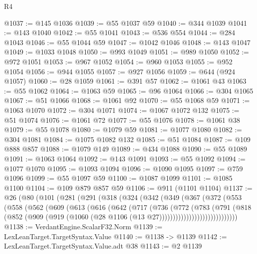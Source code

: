 \begin{lexlean}{R4}
\begin{coremodule}
@1037 := @145 @1036
@1039 := @55 @1037 @59
@1040 := @344 @1039
@1041 := @143 @1040
@1042 := @55 @1041
@1043 := @536 @554
@1044 := @284 @1043
@1046 := @55 @1044 @59
@1047 := @1042 @1046
@1048 := @143 @1047
@1049 := @1033 @1048
@1050 := @993 @1049
@1051 := @989 @1050
@1052 := @972 @1051
@1053 := @967 @1052
@1054 := @960 @1053
@1055 := @952 @1054
@1056 := @944 @1055
@1057 := @927 @1056
@1059 := @644 (@924 @1057)
@1060 := @28 @1059
@1061 := @391 @57
@1062 := @1061 @43
@1063 := @55 @1062
@1064 := @1063 @59
@1065 := @96 @1064
@1066 := @304 @1065
@1067 := @51 @1066
@1068 := @1061 @92
@1070 := @55 @1068 @59
@1071 := @1063 @1070
@1072 := @304 @1071
@1074 := @1067 @1072 @132
@1075 := @51 @1074
@1076 := @1061 @72
@1077 := @55 @1076
@1078 := @1061 @38
@1079 := @55 @1078
@1080 := @1079 @59
@1081 := @1077 @1080
@1082 := @304 @1081
@1084 := @1075 @1082 @132
@1085 := @51 @1084
@1087 := @109 @888 @857
@1088 := @1079 @149
@1089 := @434 @1088
@1090 := @55 @1089
@1091 := @1063 @1064
@1092 := @143 @1091
@1093 := @55 @1092
@1094 := @1077 @1070
@1095 := @1093 @1094
@1096 := @1090 @1095
@1097 := @759 @1096
@1099 := @55 @1097 @59
@1100 := @1087 @1099
@1101 := @1085 @1100
@1104 := @109 @879 @857 @59
@1106 := @911 (@1101 @1104)
@1137 := @26
    (@80
      (@101
        (@281
          (@291
            (@318
              (@324
                (@342
                  (@349
                    (@367
                      (@372
                        (@553
                          (@558
                            (@562
                              (@609
                                (@613
                                  (@616
                                    (@642
                                      (@717
                                        (@736
                                          (@772
                                            (@783
                                              (@791
                                                (@818
                                                  (@852
                                                    (@909
                                                      (@919
                                                        (@1060
                                                          (@28
                                                            @1106
                                                            (@13 @27)))))))))))))))))))))))))))))
@1138 := VerdantEngine.ScalarF32.Norm
@1139 := LexLeanTarget.TargetSyntax.Value
@1140 := @1138 -> @1139
@1142 := LexLeanTarget.TargetSyntax.Value.adt @38
@1143 := @2 @1139

\end{coremodule}
\end{lexlean}
